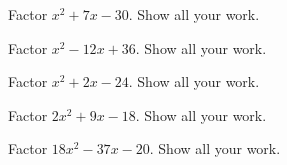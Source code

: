 \documentclass[11pt,letterpaper]{article}
\begin{document}

 Factor $x^2 + 7x - 30$. Show all your work. \pspace





\newpage





 Factor $x^2 - 12x + 36$. Show all your work. \pspace





\newpage





 Factor $x^2 + 2x - 24$. Show all your work. \pspace





\newpage





 Factor $2x^2 + 9x - 18$. Show all your work. \pspace





\newpage





 Factor $18x^2 - 37x - 20$. Show all your work. \pspace


\end{document}
